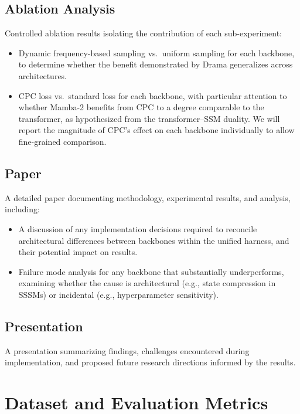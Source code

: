 \documentclass{article}
\begin{document}
\subsection{Ablation Analysis}
Controlled ablation results isolating the contribution of each
sub-experiment:
\begin{itemize}
    \item Dynamic frequency-based sampling vs.\ uniform sampling for
          each backbone, to determine whether the benefit demonstrated
          by Drama\cite{drama} generalizes across architectures.
    \item CPC loss vs.\ standard loss for each backbone, with particular
          attention to whether Mamba-2 benefits from CPC to a degree
          comparable to the transformer, as hypothesized from the
          transformer--SSM duality\cite{mamba2}. We will report the
          magnitude of CPC's effect on each backbone individually to
          allow fine-grained comparison.
\end{itemize}

\subsection{Paper}
A detailed paper documenting methodology, experimental results, and
analysis, including:
\begin{itemize}
    \item A discussion of any implementation decisions required to
          reconcile architectural differences between backbones within
          the unified harness, and their potential impact on results.
    \item Failure mode analysis for any backbone that substantially
          underperforms, examining whether the cause is architectural
          (e.g., state compression in SSSMs) or incidental (e.g.,
          hyperparameter sensitivity).
\end{itemize}

\subsection{Presentation}
A presentation summarizing findings, challenges encountered during
implementation, and proposed future research directions informed by
the results.

\section{Dataset and Evaluation Metrics}
\end{document}
